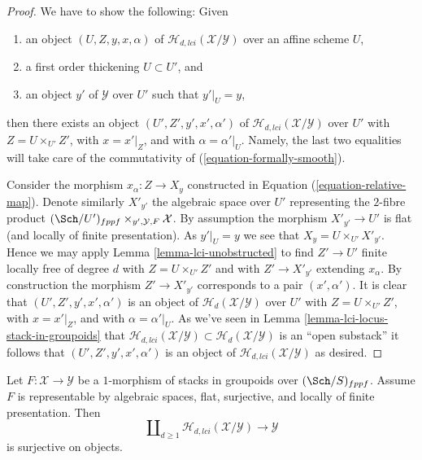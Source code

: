 \begin{proof}
We have to show the following: Given
\begin{enumerate}
\item an object $(U, Z, y, x, \alpha)$ of
$\mathcal{H}_{d, lci}(\mathcal{X}/\mathcal{Y})$ over an affine scheme $U$,
\item a first order thickening $U \subset U'$, and
\item an object $y'$ of $\mathcal{Y}$ over $U'$ such that $y'|_U = y$,
\end{enumerate}
then there exists an object $(U', Z', y', x', \alpha')$ of
$\mathcal{H}_{d, lci}(\mathcal{X}/\mathcal{Y})$ over $U'$ with
$Z = U \times_{U'} Z'$, with $x = x'|_Z$, and with
$\alpha = \alpha'|_U$. Namely, the last two equalities will take care
of the commutativity of (\ref{equation-formally-smooth}).

\medskip\noindent
Consider the morphism $x_\alpha : Z \to X_y$ constructed in
Equation (\ref{equation-relative-map}). Denote similarly $X'_{y'}$
the algebraic space over $U'$ representing the $2$-fibre product
$(\Sch/U')_{fppf} \times_{y', \mathcal{Y}, F} \mathcal{X}$.
By assumption the morphism $X'_{y'} \to U'$ is flat (and locally of finite
presentation). As $y'|_U = y$ we see that $X_y = U \times_{U'} X'_{y'}$.
Hence we may apply
Lemma \ref{lemma-lci-unobstructed}
to find $Z' \to U'$ finite locally free of degree $d$ with
$Z = U \times_{U'} Z'$ and with $Z' \to X'_{y'}$ extending $x_\alpha$.
By construction the morphism $Z' \to X'_{y'}$ corresponds to a pair
$(x', \alpha')$. It is clear that $(U', Z', y', x', \alpha')$
is an object of $\mathcal{H}_d(\mathcal{X}/\mathcal{Y})$ over $U'$
with $Z = U \times_{U'} Z'$, with $x = x'|_Z$, and with
$\alpha = \alpha'|_U$. As we've seen in
Lemma \ref{lemma-lci-locus-stack-in-groupoids}
that $\mathcal{H}_{d, lci}(\mathcal{X}/\mathcal{Y}) \subset
\mathcal{H}_d(\mathcal{X}/\mathcal{Y})$ is an ``open substack''
it follows that $(U', Z', y', x', \alpha')$ is an object of
$\mathcal{H}_{d, lci}(\mathcal{X}/\mathcal{Y})$ as desired.
\end{proof}

\begin{lemma}
\label{lemma-lci-surjective}
Let $F : \mathcal{X} \to \mathcal{Y}$ be a $1$-morphism of stacks in groupoids
over $(\Sch/S)_{fppf}$. Assume $F$ is representable by algebraic
spaces, flat, surjective, and locally of finite presentation. Then
$$
\coprod\nolimits_{d \geq 1} \mathcal{H}_{d, lci}(\mathcal{X}/\mathcal{Y})
\longrightarrow
\mathcal{Y}
$$
is surjective on objects.
\end{lemma}

